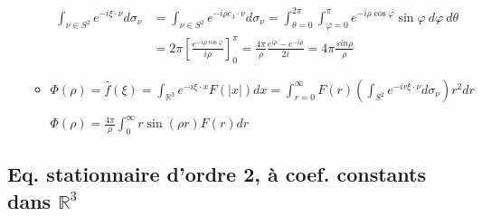 \documentclass[10pt,a4paper,oneside]{article}
\begin{document}
\begin{itemize}
\begin{itemize}
\begin{align*}
\int_{\nu \in S^2} e^{-i \xi \cdot \nu} d \sigma_\nu &= \int_{\nu \in S^2} e^{-i \rho e_3 \cdot \nu} d \sigma_\nu = \int_{\theta = 0}^{2\pi} \int_{\varphi = 0}^\pi e^{-i \rho \cos \varphi} \sin \varphi\ d\varphi\ d\theta \\
&= 2\pi \left[ \frac{e^{-i \rho \cos \varphi}}{i \rho} \right]^\pi_0 = \frac{4\pi}{\rho} \frac{e^{i\rho} - e^{-i\rho}}{2i} = 4\pi \frac{sin \rho}{\rho}
\end{align*}

\item
$\Phi(\rho) = \hat{f}(\xi) = \int_{\mathbb{R}^3} e^{-i \xi \cdot x} F(|x|) dx = \int_{r = 0}^\infty F(r) \left( \int_{S^2} e^{-ir \xi \cdot \nu} d\sigma_\nu \right) r^2 dr$

$\Phi(\rho) = \frac{4 \pi}{\rho} \int_0^\infty r \sin(\rho r) F(r) dr$
\end{itemize}

\end{itemize}

\subsection{Eq. stationnaire d'ordre 2, à coef. constants dans $\mathbb{R}^3$}
\end{document}
